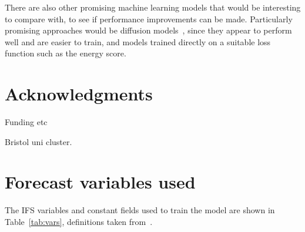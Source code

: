 \documentclass{article}
\begin{document}
There are also other promising machine learning models that would be interesting to compare with, to see if performance improvements can be made. Particularly promising approaches would be diffusion models~\citep{addison_machine_2022, leinonen_latent_2023}, since they appear to perform well and are easier to train, and models trained directly on a suitable loss function such as the energy score.

 









\section*{Acknowledgments}

Funding etc

Bristol uni cluster.



\appendix

\section{Forecast variables used}\label{app:fcst_vars}
The IFS variables and constant fields used to train the model are shown in Table~\ref{tab:vars}, definitions taken from~\citep{ecmwf_parameter_2023}.
\end{document}
